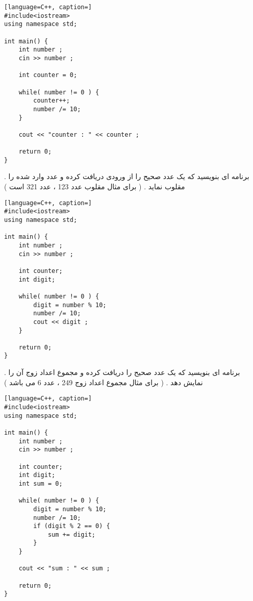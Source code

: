 \documentclass[12pt]{article}
\begin{document}
\begin{latin}
\begin{lstlisting}[language=C++, caption=]
#include<iostream>
using namespace std;

int main() {
	int number ;
	cin >> number ;
	
	int counter = 0;
	
	while( number != 0 ) {
		counter++;
		number /= 10;
	}
	
	cout << "counter : " << counter ;
	
	return 0;
}
\end{lstlisting}
\end{latin}







\newpage

 . برنامه ای بنویسید که یک عدد صحیح را از ورودی دریافت کرده و عدد وارد شده را مقلوب نماید . ( برای مثال مقلوب عدد 123 ، عدد 321 است )






\begin{latin}
\begin{lstlisting}[language=C++, caption=]
#include<iostream>
using namespace std;

int main() {
	int number ;
	cin >> number ;
	
	int counter;
	int digit;
	
	while( number != 0 ) {
		digit = number % 10;
		number /= 10;
		cout << digit ;
	}
	
	return 0;
}
\end{lstlisting}
\end{latin}







\newpage

 . برنامه ای بنویسید که یک عدد صحیح را دریافت کرده و مجموع اعداد زوج آن را نمایش دهد . ( برای مثال مجموع اعداد زوج 249 ، عدد 6 می باشد )



\begin{latin}
\begin{lstlisting}[language=C++, caption=]
#include<iostream>
using namespace std;

int main() {
	int number ;
	cin >> number ;
	
	int counter;
	int digit;
	int sum = 0;
	
	while( number != 0 ) {
		digit = number % 10;
		number /= 10;
		if (digit % 2 == 0) {
			sum += digit;
		}
	}
	
	cout << "sum : " << sum ;
	
	return 0;
}
\end{lstlisting}
\end{latin}
\end{document}
